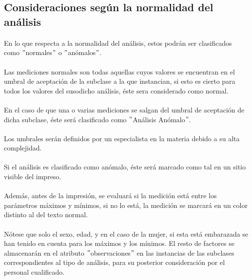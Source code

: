 \documentclass[a4paper,10pt]{article}
\begin{document}
\subsection{Consideraciones según la normalidad del análisis}
\paragraph{}
En lo que respecta a la normalidad del análisis, estos podrán ser clasificados como $"$normales$"$ o $"$anómalos$"$.
\paragraph{}
Las mediciones normales son todas aquellas cuyos valores se encuentran en el umbral de aceptación de la subclase a la que instancian, si esto es cierto para todos los valores del susodicho análisis, éste sera considerado como normal.
\paragraph{}
En el caso de que una o varias mediciones se salgan del umbral de aceptación de dicha subclase, éste será clasificado como $"$Análisis Anómalo$"$.
\paragraph{}
Los umbrales serán definidos por un especialista en la materia debido a su alta complejidad.
\paragraph{}
Si el análisis es clasificado como anómalo, éste será marcado como tal en un sitio visible del impreso.
\paragraph{}
Además, antes de la impresión, se evaluará si la medición está entre los parámetros máximos y mínimos, si no lo está, la medición se marcará en un color distinto al del texto normal.
\paragraph{}
Nótese que solo el sexo, edad, y en el caso de la mujer, si esta está embarazada se han tenido en cuenta para los máximos y los mínimos. El resto de factores se almacenarán en el atributo $"$observaciones$"$ en las instancias de las subclases correspondientes al tipo de análisis, para su posterior consideración por el personal cualificado.
\pagebreak
\end{document}
